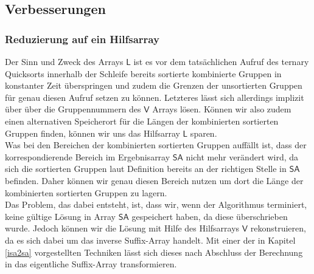 \subsection{Verbesserungen}
\subsubsection{Reduzierung auf ein Hilfsarray}
Der Sinn und Zweck des Arrays $\mathsf{L}$ ist es vor dem tatsächlichen Aufruf des ternary Quicksorts innerhalb der Schleife bereits sortierte kombinierte Gruppen in konstanter Zeit überspringen und zudem die Grenzen der unsortierten Gruppen für genau diesen Aufruf setzen zu können. Letzteres lässt sich allerdings implizit über über die Gruppennummern des $\mathsf{V}$ Arrays lösen. Können wir also zudem einen alternativen Speicherort für die Längen der kombinierten sortierten Gruppen finden, können wir uns das Hilfsarray $\mathsf{L}$ sparen.\\
Was bei den Bereichen der kombinierten sortierten Gruppen auffällt ist, dass der korrespondierende Bereich im Ergebnisarray $\mathsf{SA}$ nicht mehr verändert wird, da sich die sortierten Gruppen laut Definition bereits an der richtigen Stelle in $\mathsf{SA}$ befinden. Daher können wir genau diesen Bereich nutzen um dort die Länge der kombinierten sortierten Gruppen zu lagern.\\
Das Problem, das dabei entsteht, ist, dass wir, wenn der Algorithmus terminiert, keine gültige Lösung in Array $\mathsf{SA}$ gespeichert haben, da diese überschrieben wurde. Jedoch können wir die Lösung mit Hilfe des Hilfsarrays $\mathsf{V}$ rekonstruieren, da es sich dabei um das inverse Suffix-Array handelt. Mit einer der in Kapitel \ref{isa2sa} vorgestellten Techniken lässt sich dieses nach Abschluss der Berechnung in das eigentliche Suffix-Array transformieren.\\


